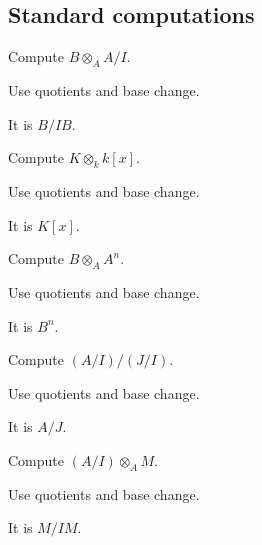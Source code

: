 \subsection*{Standard computations}

\begin{exercise}\label{exr:v11-expand-01}
Compute $B\otimes_AA/I$.
\end{exercise}
\begin{hint}
Use quotients and base change.
\end{hint}
\begin{solution}
It is $B/IB$.
\end{solution}

\begin{exercise}\label{exr:v11-expand-02}
Compute $K\otimes_kk[x]$.
\end{exercise}
\begin{hint}
Use quotients and base change.
\end{hint}
\begin{solution}
It is $K[x]$.
\end{solution}

\begin{exercise}\label{exr:v11-expand-03}
Compute $B\otimes_AA^n$.
\end{exercise}
\begin{hint}
Use quotients and base change.
\end{hint}
\begin{solution}
It is $B^n$.
\end{solution}

\begin{exercise}\label{exr:v11-expand-04}
Compute $(A/I)/(J/I)$.
\end{exercise}
\begin{hint}
Use quotients and base change.
\end{hint}
\begin{solution}
It is $A/J$.
\end{solution}

\begin{exercise}\label{exr:v11-expand-05}
Compute $(A/I)\otimes_AM$.
\end{exercise}
\begin{hint}
Use quotients and base change.
\end{hint}
\begin{solution}
It is $M/IM$.
\end{solution}

